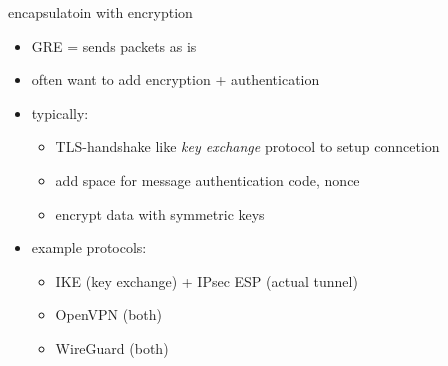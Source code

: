 \begin{frame}{encapsulatoin with encryption}
    \begin{itemize}
    \item GRE = sends packets as is
    \vspace{.5cm}
    \item often want to add encryption + authentication
    \item typically:
        \begin{itemize}
        \item TLS-handshake like \textit{key exchange} protocol to setup conncetion
        \item add space for message authentication code, nonce
        \item encrypt data with symmetric keys
        \end{itemize}
    \item example protocols:
        \begin{itemize}
        \item IKE (key exchange) + IPsec ESP (actual tunnel)
        \item OpenVPN (both)
        \item WireGuard (both)
        \end{itemize}
    \end{itemize}
\end{frame}

